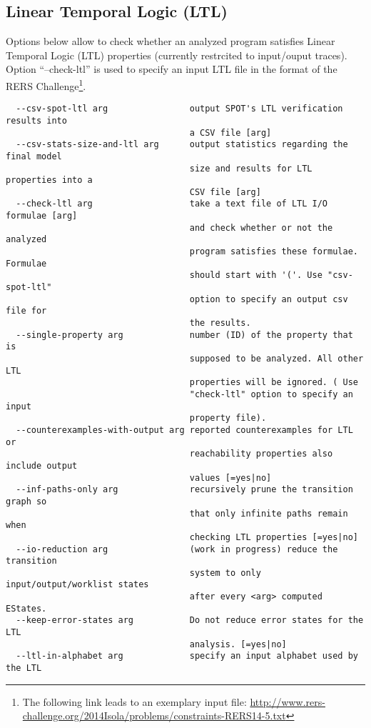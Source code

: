 \documentclass[natbib]{article}
\newcommand{\enquote}[1]{``#1''}
\begin{document}
\subsection{Linear Temporal Logic (LTL)}
Options below allow to check whether an analyzed program satisfies Linear Temporal Logic (LTL) properties 
(currently restrcited to input/ouput traces). Option \enquote{--check-ltl} is used to specify an input LTL file
in the format of the RERS Challenge\footnote{The following link leads to an exemplary input file: 
\url{http://www.rers-challenge.org/2014Isola/problems/constraints-RERS14-5.txt}}.
\begin{verbatim}
  --csv-spot-ltl arg                output SPOT's LTL verification results into
                                    a CSV file [arg]
  --csv-stats-size-and-ltl arg      output statistics regarding the final model
                                    size and results for LTL properties into a 
                                    CSV file [arg]
  --check-ltl arg                   take a text file of LTL I/O formulae [arg] 
                                    and check whether or not the analyzed 
                                    program satisfies these formulae. Formulae 
                                    should start with '('. Use "csv-spot-ltl" 
                                    option to specify an output csv file for 
                                    the results.
  --single-property arg             number (ID) of the property that is 
                                    supposed to be analyzed. All other LTL 
                                    properties will be ignored. ( Use 
                                    "check-ltl" option to specify an input 
                                    property file).
  --counterexamples-with-output arg reported counterexamples for LTL or 
                                    reachability properties also include output
                                    values [=yes|no]
  --inf-paths-only arg              recursively prune the transition graph so 
                                    that only infinite paths remain when 
                                    checking LTL properties [=yes|no]
  --io-reduction arg                (work in progress) reduce the transition 
                                    system to only input/output/worklist states
                                    after every <arg> computed EStates.
  --keep-error-states arg           Do not reduce error states for the LTL 
                                    analysis. [=yes|no]
  --ltl-in-alphabet arg             specify an input alphabet used by the LTL 

\end{verbatim}
\end{document}
